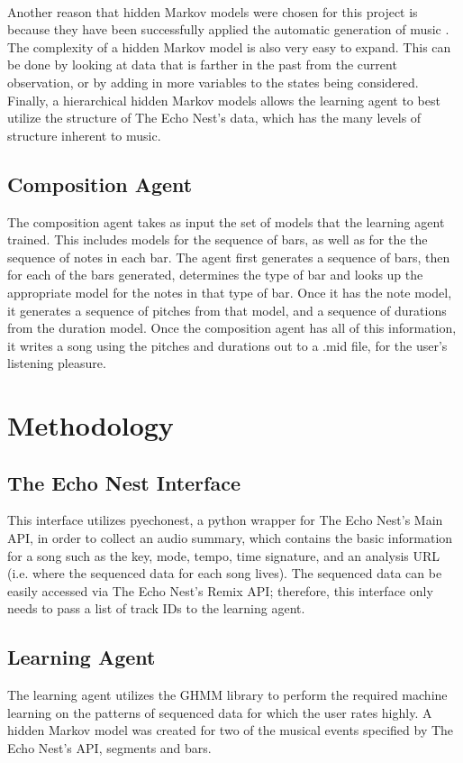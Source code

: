 \documentclass{article}
\begin{document}
\\
Another reason that hidden Markov models were chosen for this project is because they have been successfully applied the automatic generation of music \cite{5492670}. The complexity of a hidden Markov model is also very easy to expand. This can be done by looking at data that is farther in the past from the current observation, or by adding in more variables to the states being considered. Finally, a hierarchical hidden Markov models allows the learning agent to best utilize the structure of The Echo Nest's data, which has the many levels of structure inherent to music.\\

\subsection{Composition Agent}
The composition agent takes as input the set of models that the learning agent trained. This includes models for the sequence of bars, as well as for the the sequence of notes in each bar. The agent first generates a sequence of bars, then for each of the bars generated, determines the type of bar and looks up the appropriate model for the notes in that type of bar. Once it has the note model, it generates a sequence of pitches from that model, and a sequence of durations from the duration model. Once the composition agent has all of this information, it writes a song using the pitches and durations out to a .mid file, for the user’s listening pleasure.

\section{Methodology}
\subsection{The Echo Nest Interface}
This interface utilizes pyechonest, a python wrapper for The Echo Nest's Main API, in order to collect an audio summary, which contains the basic information for a song such as the key, mode, tempo, time signature, and an analysis URL (i.e. where the sequenced data for each song lives). The sequenced data can be easily accessed via The Echo Nest's Remix API; therefore, this interface only needs to pass a list of track IDs to the learning agent.

\subsection{Learning Agent}
The learning agent utilizes the GHMM library to perform the required machine learning on the patterns of sequenced data for which the user rates highly. A hidden Markov model was created for two of the musical events specified by The Echo Nest's API, segments and bars.
\end{document}
